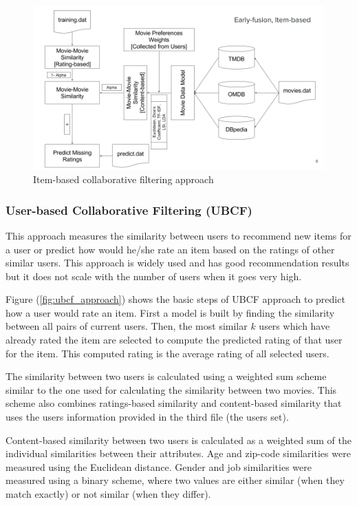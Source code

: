 \documentclass{sigish}
\begin{document}
\begin{figure}
	\centering
	\includegraphics[width=\columnwidth]{images/ibcf_approach.png}
	\caption{Item-based collaborative filtering approach}
	\label{fig:ibcf_approach}
\end{figure}

\subsubsection{User-based Collaborative Filtering (UBCF)}

This approach measures the similarity between users to recommend new items for a user or predict how would he/she rate an item based on the ratings of other similar users. This approach is widely used and has good recommendation results but it does not scale with the number of users when it goes very high.

Figure (\ref{fig:ubcf_approach}) shows the basic steps of UBCF approach to predict how a user would rate an item. First a model is built by finding the similarity between all pairs of current users. Then, the most similar $ k $ users which have already rated the item are selected to compute the predicted rating of that user for the item. This computed rating is the average rating of all selected users.

The similarity between two users is calculated using a weighted sum scheme similar to the one used for calculating the similarity between two movies. This scheme also combines ratings-based similarity and content-based similarity that uses the users information provided in the third file (the users set).

Content-based similarity between two users is calculated as a weighted sum of the individual similarities between their attributes. Age and zip-code similarities were measured using the Euclidean distance. Gender and job similarities were measured using a binary scheme, where two values are either similar (when they match exactly) or not similar (when they differ).
\end{document}
